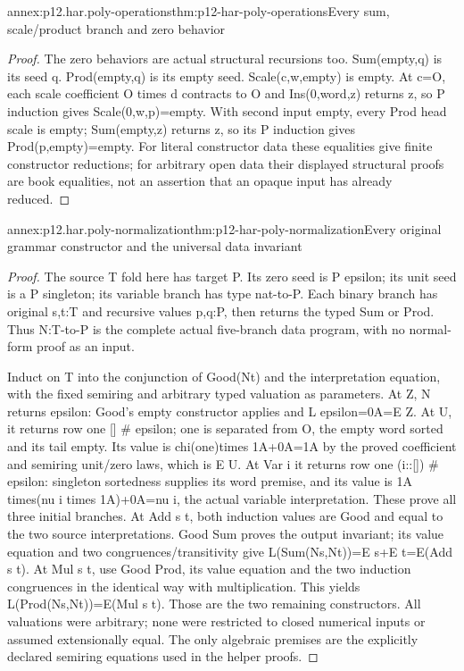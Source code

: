 \begin{annexitem}{annex:p12.har.poly-operations}{thm:p12-har-poly-operations}{Every sum, scale/product branch and zero behavior}
\begin{proof}
The zero behaviors are actual structural recursions too. Sum(empty,q)
is its seed q. Prod(empty,q) is its empty seed. Scale(c,w,empty) is
empty. At c=O, each scale coefficient O times d contracts to O
and Ins(0,word,z) returns z, so P induction gives Scale(0,w,p)=empty.
With second input empty, every Prod head scale is empty; Sum(empty,z)
returns z, so its P induction gives Prod(p,empty)=empty. For literal
constructor data these equalities give finite constructor reductions;
for arbitrary open data their displayed structural proofs are book
equalities, not an assertion that an opaque input has already reduced.
\end{proof}
\end{annexitem}

\begin{annexitem}{annex:p12.har.poly-normalization}{thm:p12-har-poly-normalization}{Every original grammar constructor and the universal data invariant}
\begin{proof}
The source T fold here has target P. Its zero seed is P epsilon;
its unit seed is a P singleton; its variable branch has type
nat-to-P. Each binary branch has original s,t:T and recursive values
p,q:P, then returns the typed Sum or Prod. Thus N:T-to-P is the
complete actual five-branch data program, with no normal-form proof
as an input.

Induct on T into the conjunction of Good(Nt) and the interpretation
equation, with the fixed semiring and arbitrary typed valuation as
parameters. At Z, N returns epsilon: Good's empty constructor applies
and L epsilon=0A=E Z. At U, it returns row one [] \# epsilon;
one is separated from O, the empty word sorted and its tail empty.
Its value is chi(one)times 1A+0A=1A by the proved coefficient and
semiring unit/zero laws, which is E U. At Var i it returns row one
(i::[]) \# epsilon: singleton sortedness supplies its word premise,
and its value is 1A times(nu i times 1A)+0A=nu i, the actual variable
interpretation. These prove all three initial branches.
At Add s t, both induction values are Good and equal to the two
source interpretations. Good Sum proves the output invariant; its
value equation and two congruences/transitivity give
L(Sum(Ns,Nt))=E s+E t=E(Add s t). At Mul s t, use Good Prod,
its value equation and the two induction congruences in the identical
way with multiplication. This yields L(Prod(Ns,Nt))=E(Mul s t).
Those are the two remaining constructors. All valuations were arbitrary;
none were restricted to closed numerical inputs or assumed extensionally
equal. The only algebraic premises are the explicitly declared semiring
equations used in the helper proofs.
\end{proof}
\end{annexitem}

